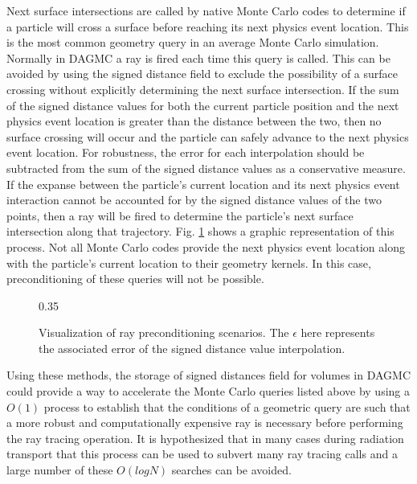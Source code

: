 Next surface intersections are called by native Monte Carlo codes to determine
if a particle will cross a surface before reaching its next physics event
location. This is the most common geometry query in an average Monte Carlo
simulation. Normally in DAGMC a ray is fired each time this query is
called. This can be avoided by using the signed distance field to exclude the
possibility of a surface crossing without explicitly determining the next
surface intersection. If the sum of the signed distance values for both the
current particle position and the next physics event location is greater than
the distance between the two, then no surface crossing will occur and the
particle can safely advance to the next physics event location. For robustness,
the error for each interpolation should be subtracted from the sum of the signed
distance values as a conservative measure. If the expanse between the particle's
current location and its next physics event interaction cannot be accounted for
by the signed distance values of the two points, then a ray will be fired to
determine the particle's next surface intersection along that
trajectory. Fig. \ref{fig:precondition_ray} shows a graphic representation of
this process. Not all Monte Carlo codes provide the next physics event location
along with the particle's current location to their geometry kernels. In this
case, preconditioning of these queries will not be possible.

\begin{figure}[ht]
  \center
  {0.35\textwidth}
  \caption{Visualization of ray preconditioning scenarios. The $\epsilon$ here represents
    the associated error of the signed distance value interpolation.}
  \label{fig:precondition_ray}
\end{figure}

Using these methods, the storage of signed distances field for volumes in DAGMC
could provide a way to accelerate the Monte Carlo queries listed above by using
a $O(1)$ process to establish that the conditions of a geometric query are such
that a more robust and computationally expensive ray is necessary before
performing the ray tracing operation. It is hypothesized that in many cases
during radiation transport that this process can be used to subvert many ray
tracing calls and a large number of these $O(logN)$ searches can be avoided.
